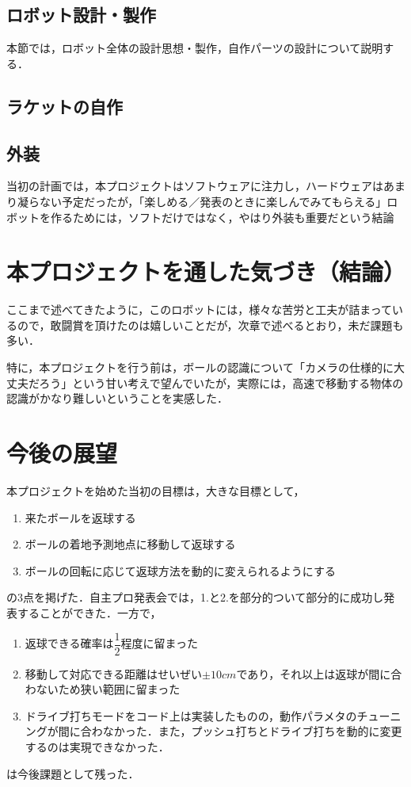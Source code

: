 \documentclass[10pt, oneside, titlepage]{ltjarticle}  %
\begin{document}
  \subsection{ロボット設計・製作}
  本節では，ロボット全体の設計思想・製作，自作パーツの設計について説明する．
  \subsection{ラケットの自作}

  \subsection{外装}
  当初の計画では，本プロジェクトはソフトウェアに注力し，ハードウェアはあまり凝らない予定だったが，「楽しめる／発表のときに楽しんでみてもらえる」ロボットを作るためには，ソフトだけではなく，やはり外装も重要だという結論

\section{本プロジェクトを通した気づき（結論）}
ここまで述べてきたように，このロボットには，様々な苦労と工夫が詰まっているので，敢闘賞を頂けたのは嬉しいことだが，次章で述べるとおり，未だ課題も多い．

特に，本プロジェクトを行う前は，ボールの認識について「カメラの仕様的に大丈夫だろう」という甘い考えで望んでいたが，実際には，高速で移動する物体の認識がかなり難しいということを実感した．


\section{今後の展望}
  本プロジェクトを始めた当初の目標は，大きな目標として，
  \begin{enumerate}
    \item 来たボールを返球する
    \item ボールの着地予測地点に移動して返球する
    \item ボールの回転に応じて返球方法を動的に変えられるようにする
  \end{enumerate}
  の3点を掲げた．自主プロ発表会では，1.と2.を部分的ついて部分的に成功し発表することができた．一方で，
  \begin{enumerate}
    \item 返球できる確率は$\dfrac{1}{2}$程度に留まった
    \item 移動して対応できる距離はせいぜい$\pm 10 cm$であり，それ以上は返球が間に合わないため狭い範囲に留まった
    \item ドライブ打ちモードをコード上は実装したものの，動作パラメタのチューニングが間に合わなかった．また，プッシュ打ちとドライブ打ちを動的に変更するのは実現できなかった．
  \end{enumerate}
  は今後課題として残った．
\end{document}

